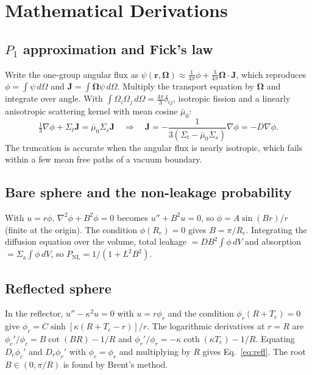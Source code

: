\documentclass[11pt,letterpaper]{article}
\newcommand{\PNL}{P_\mathrm{NL}}
\newcommand{\Sig}[1]{\Sigma_\mathrm{#1}}
\begin{document}
\section{Mathematical Derivations}
\label{app:derivations}

\subsection{\texorpdfstring{$P_1$ approximation and Fick's law}{P1 approximation and Fick's law}}
\label{app:p1}
Write the one-group angular flux as $\psi(\mathbf r,\boldsymbol\Omega) \approx \frac{1}{4\pi}\phi + \frac{3}{4\pi}\boldsymbol\Omega\cdot\mathbf J$, which reproduces $\phi=\int\psi\,d\Omega$ and $\mathbf J=\int\boldsymbol\Omega\psi\,d\Omega$. Multiply the transport equation by $\boldsymbol\Omega$ and integrate over angle. With $\int\Omega_i\Omega_j\,d\Omega = \frac{4\pi}{3}\delta_{ij}$, isotropic fission and a linearly anisotropic scattering kernel with mean cosine $\bar\mu_0$:
\[
\tfrac{1}{3}\nabla\phi + \Sigma_t\mathbf J = \bar\mu_0\Sigma_s\mathbf J
\quad\Rightarrow\quad
\mathbf J = -\frac{1}{3(\Sigma_t-\bar\mu_0\Sigma_s)}\nabla\phi = -D\nabla\phi .
\]
The truncation is accurate when the angular flux is nearly isotropic, which fails within a few mean free paths of a vacuum boundary.

\subsection{Bare sphere and the non-leakage probability}
With $u = r\phi$, $\nabla^2\phi + B^2\phi = 0$ becomes $u'' + B^2u = 0$, so $\phi = A\sin(Br)/r$ (finite at the origin). The condition $\phi(R_e)=0$ gives $B = \pi/R_e$. Integrating the diffusion equation over the volume, total leakage $= DB^2\int\phi\,dV$ and absorption $=\Sig{a}\int\phi\,dV$, so $\PNL = 1/(1+L^2B^2)$.

\subsection{Reflected sphere}
\label{app:refl}
In the reflector, $u'' - \kappa^2u = 0$ with $u = r\phi_r$ and the condition $\phi_r(R+T_e)=0$ give $\phi_r = C\sinh[\kappa(R+T_e-r)]/r$. The logarithmic derivatives at $r=R$ are $\phi_c'/\phi_c = B\cot(BR) - 1/R$ and $\phi_r'/\phi_r = -\kappa\coth(\kappa T_e) - 1/R$. Equating $D_c\phi_c'$ and $D_r\phi_r'$ with $\phi_c=\phi_r$ and multiplying by $R$ gives Eq.~\eqref{eq:refl}. The root $B\in(0,\pi/R)$ is found by Brent's method.
\end{document}
